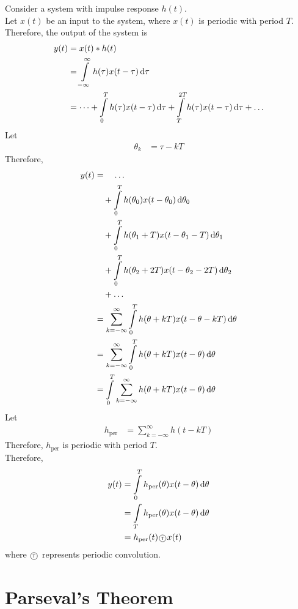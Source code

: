\documentclass[titlepage, fleqn, a4paper, 12pt, twoside]{article}
\theoremstyle{definition}
\theoremstyle{theorem}
\newcommand{\circled}[1]{%
	\begin{tikzpicture}[baseline={(char.base)}]
		\node (char) {\tiny \sf #1};
		\node[draw,circle, minimum size = 8pt, inner sep=0pt,overlay] (char.center){};
	\end{tikzpicture}
}
\begin{document}
Consider a system with impulse response $h(t)$.\\
Let $x(t)$ be an input to the system, where $x(t)$ is periodic with period $T$.\\
Therefore, the output of the system is
\begin{align*}
	y(t) &= x(t) \ast h(t)\\
	&= \int\limits_{-\infty}^{\infty} h(\tau) x(t - \tau) \dif \tau\\
	&= \dots + \int\limits_{0}^{T} h(\tau) x(t - \tau) \dif \tau + \int\limits_{T}^{2 T} h(\tau) x(t - \tau) \dif \tau + \dots
\end{align*}
Let
\begin{align*}
	\theta_k &= \tau - k T
\end{align*}
Therefore,
\begin{align*}
	y(t) &=\quad \dots\\
	&\quad + \int\limits_{0}^{T} h(\theta_0) x(t - \theta_0) \dif \theta_0\\
	&\quad + \int\limits_{0}^{T} h(\theta_1 + T) x(t - \theta_1 - T) \dif \theta_1\\
	&\quad + \int\limits_{0}^{T} h(\theta_2 + 2 T) x(t - \theta_2 - 2 T) \dif \theta_2\\
	&\quad + \dots\\
	&= \sum\limits_{k = -\infty}^{\infty} \int\limits_{0}^{T} h(\theta + k T) x(t - \theta - k T) \dif \theta\\
	&= \sum\limits_{k = -\infty}^{\infty} \int\limits_{0}^{T} h(\theta + k T) x(t - \theta) \dif \theta\\
	&= \int\limits_{0}^{T} \sum\limits_{k = -\infty}^{\infty} h(\theta + k T) x(t - \theta) \dif \theta
\end{align*}
Let
\begin{align*}
	h_{\text{per}} &= \sum\limits_{k = -\infty}^{\infty} h(t - k T)
\end{align*}
Therefore, $h_{\text{per}}$ is periodic with period $T$.\\
Therefore,
\begin{align*}
	y(t) &= \int\limits_{0}^{T} h_{\text{per}}(\theta) x(t - \theta) \dif \theta\\
	&= \int\limits_{T} h_{\text{per}}(\theta) x(t - \theta) \dif \theta\\
	&= h_{\text{per}}(t) \circled{T} x(t)
\end{align*}
where $\circled{T}$ represents periodic convolution.

\section{Parseval's Theorem}
\end{document}
